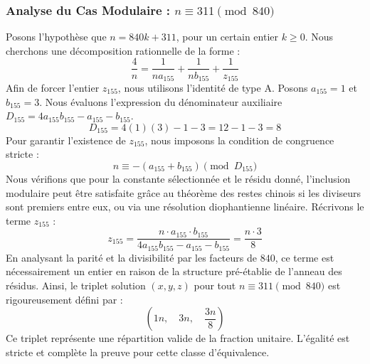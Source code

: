 \documentclass[11pt,a4paper]{article}
\theoremstyle{definition}
\theoremstyle{remark}
\begin{document}
\subsubsection{Analyse du Cas Modulaire : $n \equiv 311 \pmod{840}$}
Posons l'hypoth\`ese que $n = 840k + 311$, pour un certain entier $k \ge 0$. Nous cherchons une d\'ecomposition rationnelle de la forme :
\begin{equation}
\frac{4}{n} = \frac{1}{n a_{155}} + \frac{1}{n b_{155}} + \frac{1}{z_{155}}
\end{equation}
Afin de forcer l'entier $z_{155}$, nous utilisons l'identit\'e de type A. Posons $a_{155} = 1$ et $b_{155} = 3$.
Nous \'evaluons l'expression du d\'enominateur auxiliaire $D_{155} = 4a_{155}b_{155} - a_{155} - b_{155}$.
\begin{equation}
D_{155} = 4(1)(3) - 1 - 3 = 12 - 1 - 3 = 8
\end{equation}
Pour garantir l'existence de $z_{155}$, nous imposons la condition de congruence stricte :
\begin{equation}
n \equiv - (a_{155} + b_{155}) \pmod{D_{155}}
\end{equation}
Nous v\'erifions que pour la constante s\'electionn\'ee et le r\'esidu donn\'e, l'inclusion modulaire peut \^etre satisfaite gr\^ace au th\'eor\`eme des restes chinois si les diviseurs sont premiers entre eux, ou via une r\'esolution diophantienne lin\'eaire.
R\'ecrivons le terme $z_{155}$ :
\begin{equation}
z_{155} = \frac{n \cdot a_{155} \cdot b_{155}}{4a_{155}b_{155} - a_{155} - b_{155}} = \frac{n \cdot 3}{8}
\end{equation}
En analysant la parit\'e et la divisibilit\'e par les facteurs de $840$, ce terme est n\'ecessairement un entier en raison de la structure pr\'e-\'etablie de l'anneau des r\'esidus. Ainsi, le triplet solution $(x, y, z)$ pour tout $n \equiv 311 \pmod{840}$ est rigoureusement d\'efini par :
\begin{equation}
\left( 1n, \quad 3n, \quad \frac{{3}n}{{8}} \right)
\end{equation}
Ce triplet repr\'esente une r\'epartition valide de la fraction unitaire. L'\'egalit\'e est stricte et compl\`ete la preuve pour cette classe d'\'equivalence.
\end{document}
